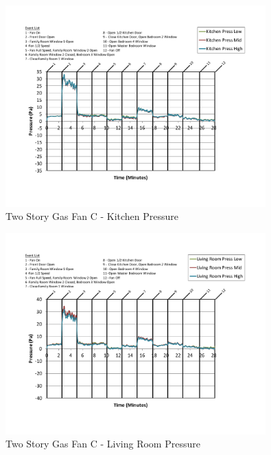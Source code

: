 \documentclass{article}
\begin{document}
\begin{appendices}
	\begin{figure}[H]
		\centering
		\includegraphics[height=3.05in,trim=0.67in 1.1in 0.67in 0.8in,clip=true]{0_Images/Results_Charts/ColdFlow/Two_Story/Gas/C/Kitchen_Pressure.pdf}
		\caption{Two Story Gas Fan C - Kitchen Pressure}
	\end{figure}
 

	\begin{figure}[H]
		\centering
		\includegraphics[height=3.05in,trim=0.67in 1.1in 0.67in 0.8in,clip=true]{0_Images/Results_Charts/ColdFlow/Two_Story/Gas/C/Living_Room_Pressure.pdf}
		\caption{Two Story Gas Fan C - Living Room Pressure}
	\end{figure}
 
	\clearpage


\end{appendices}
\end{document}
